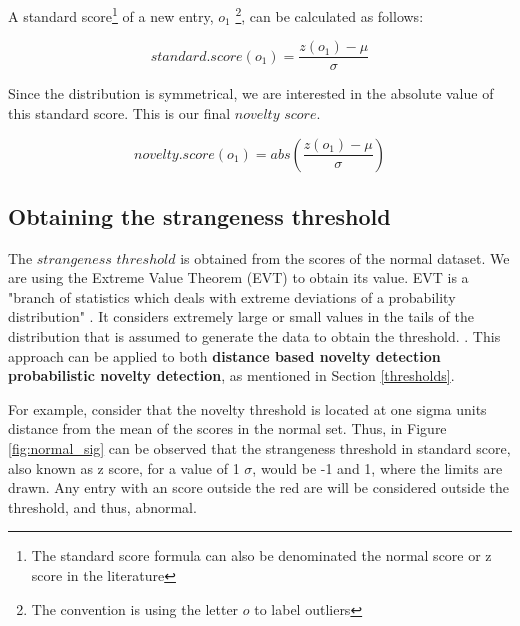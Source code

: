 A standard score\footnote{The standard score formula can also be denominated the normal score or z score in the literature} of a new entry, $o_1$ \footnote{The convention is using the letter $o$ to label outliers}, can be calculated as follows:

\begin{equation}
standard.score(o_1) = \dfrac{z(o_1) - \mu}{ \sigma}
\end{equation}

Since the distribution is symmetrical, we are interested in the absolute value of this standard score. This is our final $novelty$ $score$.

\begin{equation}
novelty.score(o_1) = abs( \dfrac{z(o_1) - \mu}{ \sigma})
\end{equation}

\subsection{Obtaining the strangeness threshold} \label{3.1.3}

\label{thres1}

The $strangeness$ $threshold$ is obtained from the scores of the normal dataset. We are using the Extreme Value Theorem (EVT) to obtain its value. EVT is a "branch of statistics which deals with extreme deviations of a probability distribution" \cite{Pimentel2014}. It considers extremely large or small values in the tails of the distribution that is assumed to generate the data to obtain the threshold. \cite{Pimentel2014}. This approach can be applied to both \textbf{distance based novelty detection} \textbf{probabilistic novelty detection}, as mentioned in Section \ref{thresholds}.

For example, consider that the novelty threshold is located at one sigma units distance from the mean of the scores in the normal set. Thus, in Figure \ref{fig:normal_sig} can be observed that the strangeness threshold in standard score, also known as z score, for a value of 1 $\sigma$, would be  -1 and 1, where the limits are drawn. Any entry with an score outside the red are will be considered outside the threshold, and thus, abnormal. 

